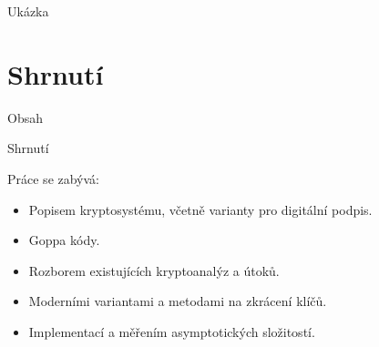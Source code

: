 \documentclass{beamer}
\begin{document}
\begin{frame}{Ukázka}

\end{frame}


\section{Shrnutí}
\begin{frame}{Obsah}
    \tableofcontents[currentsection]
\end{frame}

\begin{frame}{Shrnutí}
    \begin{block}{Práce se zabývá:}
            \begin{itemize}
                    \pause
                \item Popisem kryptosystému, včetně varianty pro digitální
                    podpis.
                    \pause
                \item Goppa kódy.
                    \pause
                \item Rozborem existujících kryptoanalýz a útoků.
                    \pause
                \item Moderními variantami a metodami na zkrácení klíčů.
                    \pause
                \item Implementací a měřením asymptotických složitostí.
            \end{itemize}
    \end{block}
\end{frame}


\end{document}
